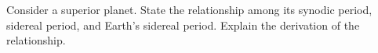 \documentclass[main.tex]{subfiles}
\begin{document}
\begin{q}{2}
Consider a superior planet. State the relationship among its synodic period,
sidereal period, and Earth's sidereal period. Explain the derivation of the
relationship.
\end{q}

\begin{sol}

\end{sol}
\end{document}
